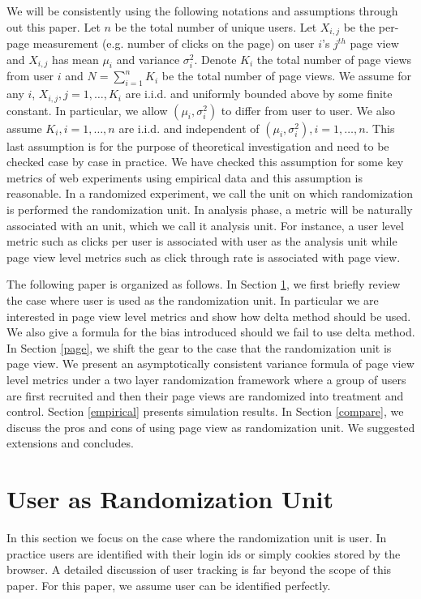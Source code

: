 \documentclass[11pt]{asaproc}
\begin{document}
We will be consistently using the following notations and assumptions through out this paper. Let $n$ be the total number of unique users. Let $X_{i,j}$ be the per-page measurement (e.g. number of clicks on the page) on user $i$'s $j^{th}$ page view and $X_{i,j}$ has mean $\mu_i$ and variance $\sigma_i^2$.  Denote $K_i$ the total number of page views from user $i$ and $N = \sum_{i=1}^n K_i$ be the total number of page views. We assume for any $i$, $X_{i,j},j=1,\dots,K_i$ are i.i.d. and uniformly bounded above by some finite constant.  In particular, we allow $(\mu_i,\sigma_i^2)$ to differ from user to user. We also assume $K_i,i=1,\dots,n$ are i.i.d. and independent of $(\mu_i,\sigma_i^2),i=1,\dots,n$. This last assumption is for the purpose of theoretical investigation and need to be checked case by case in practice. We have checked this assumption for some key metrics of web experiments using empirical data and this assumption is reasonable. In a randomized experiment, we call the unit on which randomization is performed the randomization unit. In analysis phase, a metric will be naturally associated with an unit, which we call it analysis unit. For instance, a user level metric such as clicks per user is associated with user as the analysis unit while page view level metrics such as click through rate is associated with page view. 

The following paper is organized as follows. In Section \ref{user}, we first briefly review the case where user is used as the randomization unit. In particular we are interested in page view level metrics and show how delta method should be used. We also give a formula for the bias introduced should we fail to use delta method. In Section \ref{page}, we shift the gear to the case that the randomization unit is page view. We present an asymptotically consistent variance formula of page view level metrics under a two layer randomization framework where a group of users are first recruited and then their page views are randomized into treatment and control. Section \ref{empirical} presents simulation results. In Section \ref{compare}, we discuss the pros and cons of using page view as randomization unit. We suggested extensions and concludes. 


\section{User as Randomization Unit}\label{user}
In this section we focus on the case where the randomization unit is user. In practice users are identified with their login ids or simply cookies stored by the browser. A detailed discussion of user tracking is far beyond the scope of this paper. For this paper, we assume user can be identified perfectly. 
\end{document}
